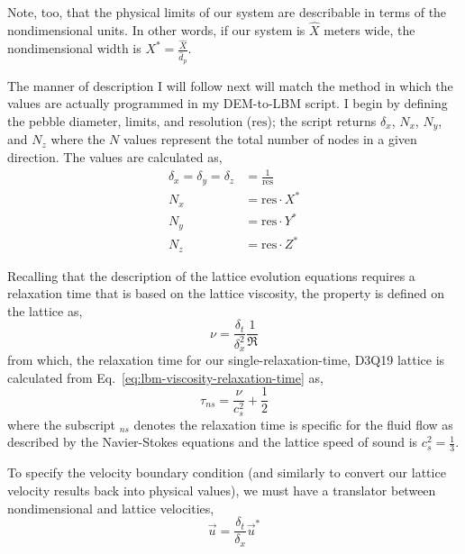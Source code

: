 Note, too, that the physical limits of our system are describable in terms of the nondimensional units. In other words, if our system is $\hat{X}$ meters wide, the nondimensional width is $X^*=\frac{\hat{X}}{\hat{d}_p}$.  


The manner of description I will follow next will match the method in which the values are actually programmed in my DEM-to-LBM script. I begin by defining the pebble diameter, limits, and resolution ($\text{res}$); the script returns $\delta_x$, $N_x$, $N_y$, and $N_z$ where the $N$ values represent the total number of nodes in a given direction. The values are calculated as,
\begin{subequations}
\begin{align}
	\delta_x = \delta_y = \delta_z & = \frac{1}{\text{res}} \\
	N_x & = \text{res}\cdot X^* \\
	N_y & = \text{res}\cdot Y^* \\
	N_z & = \text{res}\cdot Z^*
\end{align}
\end{subequations}

Recalling that the description of the lattice evolution equations requires a relaxation time that is based on the lattice viscosity, the property is defined on the lattice as,
\begin{equation}
	\nu = \frac{\delta_t}{\delta_x^2}\frac{1}{\Re}
\end{equation}
from which, the relaxation time for our single-relaxation-time, D3Q19 lattice is calculated from Eq.~\ref{eq:lbm-viscosity-relaxation-time} as,
\begin{equation}
	\tau_{ns} = \frac{\nu}{c_s^2} + \frac{1}{2}
\end{equation}
where the subscript $_{ns}$ denotes the relaxation time is specific for the fluid flow as described by the Navier-Stokes equations and the lattice speed of sound is $c_s^2 = \frac{1}{3}$.

To specify the velocity boundary condition (and similarly to convert our lattice velocity results back into physical values), we must have a translator between nondimensional and lattice velocities,
\begin{equation}\label{eq:lbm-u}
	\vec{u} = \frac{\delta_t}{\delta_x}\vec{u}^*
\end{equation}

